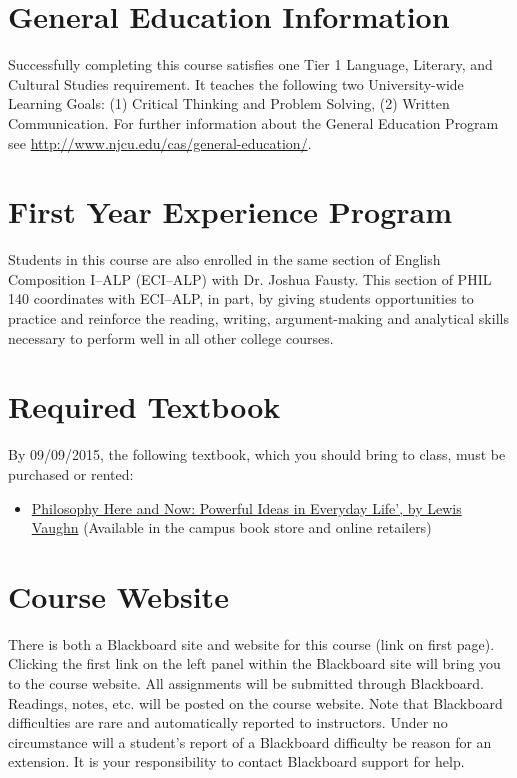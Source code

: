 \documentclass[article,oneside]{memoir}
\begin{document}
\section{General Education Information} 
Successfully completing this course satisfies one Tier 1 Language, Literary, and Cultural Studies requirement. It teaches the following two University-wide Learning Goals: (1) Critical Thinking and Problem Solving, (2) Written Communication. For further information about the General Education Program see \href{http://www.njcu.edu/cas/general-education/}{http://www.njcu.edu/cas/general-education/}.

 \section{First Year Experience Program}
Students in this course are also enrolled in the same section of English Composition I--ALP (ECI--ALP) with Dr. Joshua Fausty.  This section of PHIL 140 coordinates with ECI--ALP, in part, by giving students opportunities to practice and reinforce the reading, writing, argument-making and analytical skills necessary to perform well in all other college courses. 


\section{Required Textbook}

By 09/09/2015, the following textbook,  which you should bring to class, must be purchased or rented:

\begin{itemize}
\item
  \href{http://www.amazon.com/Philosophy-Here-Now-Powerful-Everyday/dp/0199765227}{Philosophy
  Here and Now: Powerful Ideas in Everyday Life', by Lewis Vaughn}
  (Available in the campus book store and online retailers)
\end{itemize}

\section{Course Website}
There is both a Blackboard site and website for this course (link on first page). Clicking the first link on the left panel within the Blackboard site will bring you to the course website. All assignments will be submitted through Blackboard. Readings, notes, etc. will be posted on the course website. Note that Blackboard difficulties are rare and automatically reported to instructors. Under no circumstance will a student's report of a Blackboard difficulty be reason for an extension. It is your responsibility to contact Blackboard support for help.
\end{document}
